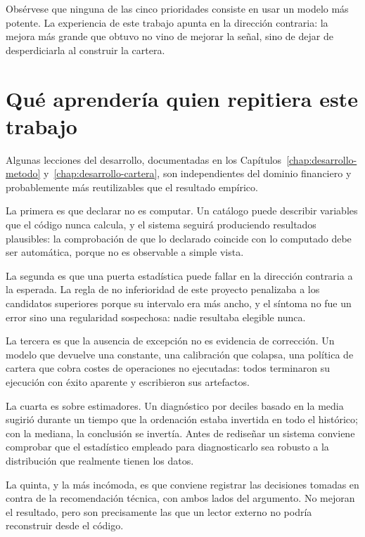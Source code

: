 Obsérvese que ninguna de las cinco prioridades consiste en usar un modelo más potente. La
experiencia de este trabajo apunta en la dirección contraria: la mejora más grande que obtuvo no
vino de mejorar la señal, sino de dejar de desperdiciarla al construir la cartera.

\section{Qué aprendería quien repitiera este trabajo}

Algunas lecciones del desarrollo, documentadas en los Capítulos~\ref{chap:desarrollo-metodo}
y~\ref{chap:desarrollo-cartera}, son
independientes del dominio financiero y probablemente más reutilizables que el resultado empírico.

La primera es que declarar no es computar. Un catálogo puede describir variables que el código nunca
calcula, y el sistema seguirá produciendo resultados plausibles: la comprobación de que lo declarado
coincide con lo computado debe ser automática, porque no es observable a simple vista.

La segunda es que una puerta estadística puede fallar en la dirección contraria a la esperada. La
regla de no inferioridad de este proyecto penalizaba a los candidatos superiores porque su intervalo
era más ancho, y el síntoma no fue un error sino una regularidad sospechosa: nadie resultaba
elegible nunca.

La tercera es que la ausencia de excepción no es evidencia de corrección. Un modelo que devuelve una
constante, una calibración que colapsa, una política de cartera que cobra costes de operaciones no
ejecutadas: todos terminaron su ejecución con éxito aparente y escribieron sus artefactos.

La cuarta es sobre estimadores. Un diagnóstico por deciles basado en la media sugirió durante un
tiempo que la ordenación estaba invertida en todo el histórico; con la mediana, la conclusión se
invertía. Antes de rediseñar un sistema conviene comprobar que el estadístico empleado para
diagnosticarlo sea robusto a la distribución que realmente tienen los datos.

La quinta, y la más incómoda, es que conviene registrar las decisiones tomadas en contra de la
recomendación técnica, con ambos lados del argumento. No mejoran el resultado, pero son
precisamente las que un lector externo no podría reconstruir desde el código.
